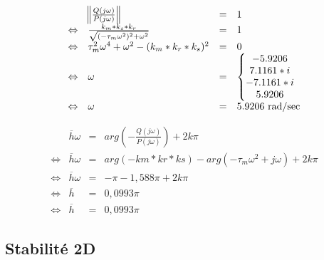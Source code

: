 \noindent\begin{minipage}[ ]{.5\textwidth}
\begin{equation}
\begin{array}{rlcl}
&\norm{\frac{Q(j\omega)}{P(j\omega)}} &=& 1 \\
\Leftrightarrow & \frac{k_m*k_s*k_r}{ \sqrt{(-\tau_m \omega^2)^2 + \omega^2}} &=& 1\\
\Leftrightarrow & \tau_m^2 \omega^4 + \omega^2 -(k_m*k_r*k_s)^2 &=& 0\\
\Leftrightarrow & \omega &=& \left\lbrace\begin{matrix}
-5.9206 \\
7.1161*i\\
- 7.1161*i\\
5.9206
\end{matrix}\right.\\
\Leftrightarrow & \omega &=& 5.9206 \text{ rad/sec}
\end{array}
\end{equation}
\end{minipage} \vline 
\begin{minipage}{.48\textwidth}
\begin{equation}
\begin{array}{rlcl}
&\overline{h}\omega &=& arg\left(-\frac{Q(j\omega)}{P(j\omega)}\right) + 2k\pi\\
\Leftrightarrow & \overline{h}\omega  &=& arg\left(-km*kr*ks \right) - arg\left( -\tau_m \omega^2 + j\omega \right) + 2k\pi\\
\Leftrightarrow & \overline{h}\omega &=& -\pi - 1,588\pi + 2k\pi\\
\Leftrightarrow & \overline{h} &=& 0,0993\pi\\
\Leftrightarrow & \overline{h} &=& 0,0993\pi 

\end{array}
\end{equation}
\end{minipage}

		\subsection{Stabilité 2D}



